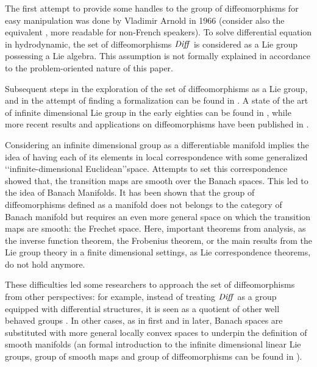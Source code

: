 The first attempt to provide some handles to the group of diffeomorphisms for easy manipulation was done by Vladimir Arnold in 1966 \cite{arnold1966geometrie} (consider also the equivalent \cite{arnold1998topological}, more readable for non-French speakers). To solve differential equation in hydrodynamic, the set of diffeomorphisms $\text{\emph{Diff}}$ is considered as a Lie group possessing a Lie algebra. This assumption is not formally explained in accordance to the problem-oriented nature of this paper. 

Subsequent steps in the exploration of the set of diffeomorphisms as a Lie group, and in the attempt of finding a formalization can be found in \cite{marsden1970hamiltonian, ebin1970groups, omori1970group, michor1980manifolds, leslie1983lie}. A state of the art of  infinite dimensional Lie group in the early eighties can be found in \cite{Milnor:84:remarks}, while more recent results and applications on diffeomorphisms have been published in \cite{ovsienko1992integrals, bauer2010sobolev, schmid2010infinite,  bauer2011geodesic}.

Considering an infinite dimensional group as a differentiable manifold implies the idea of having each of its elements in local correspondence with some generalized \lq\lq infinite-dimensional Euclidean\rq\rq\phantom{z}space. Attempts to set this correspondence showed that, the transition maps are smooth over the Banach spaces. This led to the idea of Banach Manifolds. It has been shown \cite{khesin2008geometry} that the group of diffeomorphisms defined as a manifold does not belongs to the category of Banach manifold but requires an even more general space on which the transition maps are smooth: the Frechet space. Here, important theorems from analysis, as the inverse function theorem, the Frobenius theorem, or the main results from the Lie group theory in a finite dimensional settings, as Lie correspondence theorems, do not hold anymore. 

These difficulties led some researchers to approach the set of diffeomorphisms from other perspectives: 
for example, instead of treating $\text{\emph{Diff}}$ as a group equipped with differential structures, it is seen as a quotient of other well behaved groups \cite{wojtynski1994one}. In other cases, as in \cite{marsden1970hamiltonian} first and in \cite{milnor1984remarks} later, Banach spaces are substituted with more general locally convex spaces to underpin the definition of smooth manifolds (an formal introduction to the infinite dimensional linear Lie groups, group of smooth maps and group of diffeomorphisms can be found in \cite{neeb2006infinite}).

